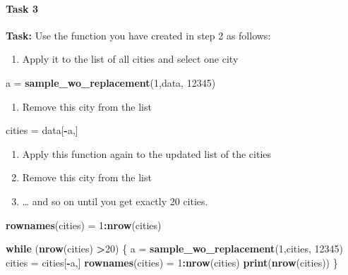 \documentclass[]{article}
\newenvironment{Shaded}{\begin{snugshade}}{\end{snugshade}}
\newcommand{\KeywordTok}[1]{\textcolor[rgb]{0.13,0.29,0.53}{\textbf{#1}}}
\newcommand{\DecValTok}[1]{\textcolor[rgb]{0.00,0.00,0.81}{#1}}
\newcommand{\StringTok}[1]{\textcolor[rgb]{0.31,0.60,0.02}{#1}}
\newcommand{\ControlFlowTok}[1]{\textcolor[rgb]{0.13,0.29,0.53}{\textbf{#1}}}
\newcommand{\OperatorTok}[1]{\textcolor[rgb]{0.81,0.36,0.00}{\textbf{#1}}}
\newcommand{\NormalTok}[1]{#1}
\providecommand{\tightlist}{%
  \setlength{\itemsep}{0pt}\setlength{\parskip}{0pt}}
\let\oldparagraph\paragraph
\renewcommand{\paragraph}[1]{\oldparagraph{#1}\mbox{}}
\begin{document}
\paragraph{Task 3}\label{task-3}

\textbf{Task:} Use the function you have created in step 2 as follows:

\begin{enumerate}
\def\labelenumi{(\alph{enumi})}
\tightlist
\item
  Apply it to the list of all cities and select one city
\end{enumerate}

\begin{Shaded}
\begin{Highlighting}[]
\NormalTok{a =}\StringTok{ }\KeywordTok{sample_wo_replacement}\NormalTok{(}\DecValTok{1}\NormalTok{,data, }\DecValTok{12345}\NormalTok{)}
\end{Highlighting}
\end{Shaded}

\begin{enumerate}
\def\labelenumi{(\alph{enumi})}
\setcounter{enumi}{1}
\tightlist
\item
  Remove this city from the list
\end{enumerate}

\begin{Shaded}
\begin{Highlighting}[]
\NormalTok{cities =}\StringTok{ }\NormalTok{data[}\OperatorTok{-}\NormalTok{a,]}
\end{Highlighting}
\end{Shaded}

\begin{enumerate}
\def\labelenumi{(\alph{enumi})}
\setcounter{enumi}{2}
\tightlist
\item
  Apply this function again to the updated list of the cities
\item
  Remove this city from the list
\item
  \ldots{} and so on until you get exactly 20 cities.
\end{enumerate}

\begin{Shaded}
\begin{Highlighting}[]
\KeywordTok{rownames}\NormalTok{(cities) =}\StringTok{ }\DecValTok{1}\OperatorTok{:}\KeywordTok{nrow}\NormalTok{(cities)}

\ControlFlowTok{while}\NormalTok{ (}\KeywordTok{nrow}\NormalTok{(cities) }\OperatorTok{>}\DecValTok{20}\NormalTok{) \{}
\NormalTok{  a =}\StringTok{ }\KeywordTok{sample_wo_replacement}\NormalTok{(}\DecValTok{1}\NormalTok{,cities, }\DecValTok{12345}\NormalTok{)}
\NormalTok{  cities =}\StringTok{ }\NormalTok{cities[}\OperatorTok{-}\NormalTok{a,]}
  \KeywordTok{rownames}\NormalTok{(cities) =}\StringTok{ }\DecValTok{1}\OperatorTok{:}\KeywordTok{nrow}\NormalTok{(cities)}
  \KeywordTok{print}\NormalTok{(}\KeywordTok{nrow}\NormalTok{(cities))}
\NormalTok{\}}
\end{Highlighting}
\end{Shaded}
\end{document}
